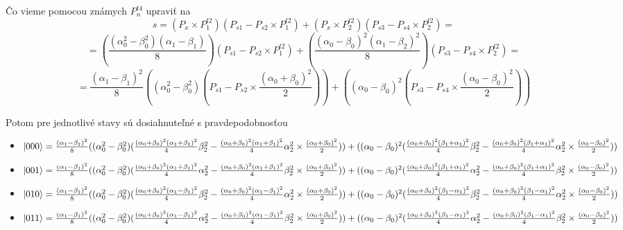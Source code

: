 Čo vieme pomocou známych \(P^{t4}_n\) upraviť na 
\[s = (P_x \times P^{t2}_1)(P_{s1} - P_{s2} \times P^{t2}_1) + (P_x \times P^{t2}_2)(P_{s3} - P_{s4} \times P^{t2}_2) = \]
\[= (\frac{(\alpha^2_0 - \beta^2_0)(\alpha_1 - \beta_1)}{8})(P_{s1} - P_{s2} \times P^{t2}_1) + (\frac{(\alpha_0 - \beta_0)^2(\alpha_1 - \beta_2)^2}{8})(P_{s3} - P_{s4} \times P^{t2}_2) = \]
\[= \frac{(\alpha_1 - \beta_1)^2}{8}((\alpha^2_0 - \beta^2_0)(P_{s1} - P_{s2} \times \frac{(\alpha_0 + \beta_0)^2}{2})) + ((\alpha_0 - \beta_0)^2(P_{s3} - P_{s4} \times \frac{(\alpha_0 - \beta_0)^2}{2}))\]

Potom pre jednotlivé stavy sú dosiahnuteľné s pravdepodobnosťou
\begin{itemize}
\item[] \(\ket{000} = \frac{(\alpha_1 - \beta_1)^2}{8}((\alpha^2_0 - \beta^2_0)(\frac{(\alpha_0 + \beta_0)^2(\alpha_1 + \beta_1)^2}{4}\beta^2_2 - \frac{(\alpha_0 + \beta_0)^2(\alpha_1 + \beta_1)^2}{4}\alpha^2_2 \times \frac{(\alpha_0 + \beta_0)^2}{2})) + ((\alpha_0 - \beta_0)^2(\frac{(\alpha_0 + \beta_0)^2(\beta_1 + \alpha_1)^2}{4}\beta^2_2 - \frac{(\alpha_0 + \beta_0)^2(\beta_1 + \alpha_1)^2}{4}\alpha^2_2 \times \frac{(\alpha_0 - \beta_0)^2}{2}))\)

\item[] \(\ket{001} = \frac{(\alpha_1 - \beta_1)^2}{8}((\alpha^2_0 - \beta^2_0)(\frac{(\alpha_0 + \beta_0)^2(\alpha_1 + \beta_1)^2}{4}\alpha^2_2 - \frac{(\alpha_0 + \beta_0)^2(\alpha_1 + \beta_1)^2}{4}\beta^2_2 \times \frac{(\alpha_0 + \beta_0)^2}{2})) + ((\alpha_0 - \beta_0)^2(\frac{(\alpha_0 + \beta_0)^2(\beta_1 + \alpha_1)^2}{4}\alpha^2_2 - \frac{(\alpha_0 + \beta_0)^2(\beta_1 + \alpha_1)^2}{4}\beta^2_2 \times \frac{(\alpha_0 - \beta_0)^2}{2}))\) 

\item[] \(\ket{010} = \frac{(\alpha_1 - \beta_1)^2}{8}((\alpha^2_0 - \beta^2_0)(\frac{(\alpha_0 + \beta_0)^2(\alpha_1 - \beta_1)^2}{4}\beta^2_2 - \frac{(\alpha_0 + \beta_0)^2(\alpha_1 - \beta_1)^2}{4}\alpha^2_2 \times \frac{(\alpha_0 + \beta_0)^2}{2})) + ((\alpha_0 - \beta_0)^2(\frac{(\alpha_0 + \beta_0)^2(\beta_1 - \alpha_1)^2}{4}\beta^2_2 - \frac{(\alpha_0 + \beta_0)^2(\beta_1 - \alpha_1)^2}{4}\alpha^2_2 \times \frac{(\alpha_0 - \beta_0)^2}{2}))\)

\item[] \(\ket{011} = \frac{(\alpha_1 - \beta_1)^2}{8}((\alpha^2_0 - \beta^2_0)(\frac{(\alpha_0 + \beta_0)^2(\alpha_1 - \beta_1)^2}{4}\alpha^2_2 - \frac{(\alpha_0 + \beta_0)^2(\alpha_1 - \beta_1)^2}{4}\beta^2_2 \times \frac{(\alpha_0 + \beta_0)^2}{2})) + ((\alpha_0 - \beta_0)^2(\frac{(\alpha_0 + \beta_0)^2(\beta_1 - \alpha_1)^2}{4}\alpha^2_2 - \frac{(\alpha_0 + \beta_0)^2(\beta_1 - \alpha_1)^2}{4}\beta^2_2 \times \frac{(\alpha_0 - \beta_0)^2}{2}))\)


\end{itemize}

